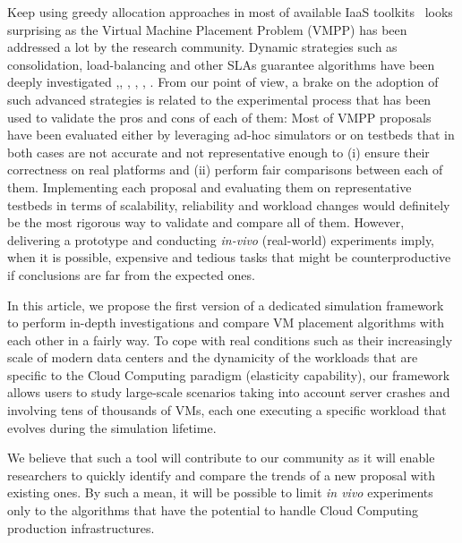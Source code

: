 \documentclass[conference]{IEEEtran}
\begin{document}
Keep using  greedy allocation approaches in most of available IaaS
toolkits~\cite{openstack, opennebula, cloudstack} looks surprising
as the Virtual Machine Placement Problem (VMPP) has been addressed a
lot by the research community. Dynamic strategies such as
consolidation,  load-balancing and other SLAs guarantee algorithms
have been deeply investigated \cite{Hermenier:2009:ECM:1508293.1508300},\cite{feller:ccgrid12},
\cite{quesnel:cpe2012},
\cite{5935254}, \cite{5715067}, \cite{5328077}.
From our point of view, a brake on the adoption of such advanced strategies is
related to the experimental process that has been used to validate the
pros and cons of each of them: Most of VMPP proposals have been
evaluated either by leveraging ad-hoc simulators or on testbeds that
in both cases are not accurate and not representative enough to (i)
ensure their correctness on real platforms and (ii) perform fair
comparisons between each of them.
%
Implementing each proposal and evaluating them on representative
testbeds in terms of scalability, reliability and workload changes
would definitely be the most rigorous way to validate and compare all
of them. However, delivering a prototype and conducting
\textit{in-vivo} (\ie real-world) experiments imply, when it is
possible, expensive and tedious tasks that might be counterproductive
if conclusions are far from the expected ones.
%

In this article, we propose the first version of a dedicated
simulation framework to perform in-depth investigations and compare VM
placement algorithms with each other in a fairly way. To cope with
real conditions such as their increasingly scale of modern data
centers and the dynamicity of the workloads that are specific to the
Cloud Computing paradigm (\ie elasticity capability), our framework
allows users to study large-scale scenarios taking into account server
crashes and involving tens of thousands of VMs, each one executing a
specific workload that evolves during the simulation lifetime.

We believe that such a tool will contribute to
our community as it will enable researchers to quickly identify and
compare the trends of a new proposal with existing ones. By such a
mean, it will be possible to limit \textit{in vivo} experiments only
to the algorithms that have the potential to handle Cloud Computing
production infrastructures.
\end{document}

